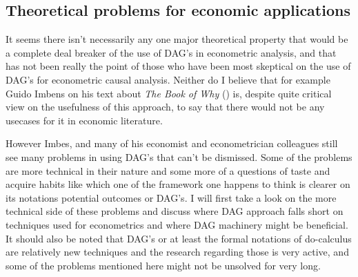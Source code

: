 \documentclass[main=english,12pt,a4paper,pdftex,econ,utf8]{aaltothesis}
\begin{document}
\subsection{Theoretical problems for economic applications}

It seems there isn't necessarily any one major theoretical property that would be a complete deal breaker of the use of DAG's in econometric analysis, and that has not been really the point of those who have been most skeptical on the use of DAG's for econometric causal analysis. Neither do I believe that for example Guido Imbens on his text about \textit{The Book of Why} (\cite{PearlMackenzie18}) is, despite quite critical view on the usefulness of this approach, to say that there would not be any usecases for it in economic literature.

However Imbes, and many of his economist and econometrician colleagues still see many problems in using DAG's that can't be dismissed. Some of the problems are more technical in their nature and some more of a questions of taste and acquire habits like which one of the framework one happens to think is clearer on its notations potential outcomes or DAG's. I will first take  a look on the more technical side of these problems and discuss where DAG approach falls short on techniques used for econometrics and where DAG machinery might be beneficial. It should also be noted that DAG's or at least the formal notations of do-calculus are relatively new techniques and the research regarding those is very active, and some of the problems mentioned here might not be unsolved for very long.



\clearpage

\printbibliography
\end{document}
